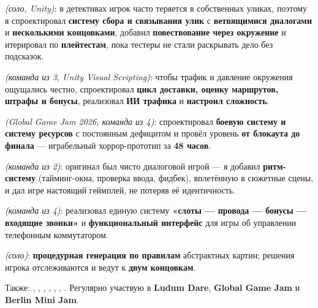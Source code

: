 \documentclass[10pt]{article}
\begin{document}
\begin{points}
  \item {} \textit{(соло, Unity)}:
        в детективах игрок часто теряется в собственных уликах, поэтому я спроектировал \textbf{систему сбора и связывания
        улик} с \textbf{ветвящимися диалогами} и \textbf{несколькими концовками}, добавил \textbf{повествование
        через окружение} и итерировал по \textbf{плейтестам}, пока тестеры не стали раскрывать дело без подсказок.
  \item {} \textit{(команда из 3, Unity Visual Scripting)}:
        чтобы трафик и давление окружения ощущались честно, спроектировал \textbf{цикл доставки, оценку маршрутов,
        штрафы и бонусы}, реализовал \textbf{ИИ трафика} и \textbf{настроил сложность}.
  \item {} \textit{(Global Game Jam 2026, команда из 4)}:
        спроектировал \textbf{боевую систему и систему ресурсов} с постоянным дефицитом и провёл уровень
        \textbf{от блокаута до финала} --- играбельный хоррор-прототип за \textbf{48 часов}.
  \item {} \textit{(команда из 2)}:
        оригинал был чисто диалоговой игрой --- я добавил \textbf{ритм-систему} (тайминг-окна, проверка ввода, фидбек),
        вплетённую в сюжетные сцены, и дал игре настоящий геймплей, не потеряв её идентичность.
  \item {} \textit{(команда из 4)}: реализовал единую систему \textbf{«слоты --- провода --- бонусы ---
        входящие звонки»} и \textbf{функциональный интерфейс} для игры об управлении телефонным коммутатором.
  \item {} \textit{(соло)}: \textbf{процедурная генерация
        по правилам} абстрактных картин; решения игрока отслеживаются и ведут к \textbf{двум концовкам}.
  \item Также: ,
        ,
        ,
        ,
        ,
        ,
        .
        Регулярно участвую в \textbf{Ludum Dare}, \textbf{Global Game Jam} и \textbf{Berlin Mini Jam}.
\end{points}
\end{document}
